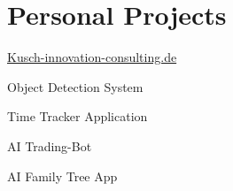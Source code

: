 \section{Personal Projects}

\begin{highlights}
    \item \href{https://kusch-innovation-consulting.de/}{Kusch-innovation-consulting.de}
    \item Object Detection System
    \item Time Tracker Application
    \item AI Trading-Bot
    \item AI Family Tree App
\end{highlights}
